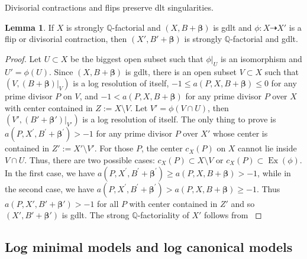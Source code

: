\documentclass[11pt]{amsart}
\numberwithin{equation}{section}
\def\bbeta{\boldsymbol{\beta}}
\def\dim{\operatorname{dim}}
\newcommand\Q{{\mathbb{Q}}}
\theoremstyle{definition}
\theoremstyle{definition}
\newtheorem{theorem}{Theorem}[section]
\newtheorem{lemma}[theorem]{Lemma}
\theoremstyle{definition}
\begin{document}
Divisorial contractions and flips preserve dlt singularities.
\begin{lemma}
If $X$ is strongly $\Q$-factorial and $(X,B+\bbeta)$ is gdlt and $\phi:X\dasharrow X'$ is a flip or divisorial contraction, then $(X',B'+\bbeta )$ is strongly $\Q$-factorial and gdlt. 
\end{lemma}
\begin{proof}
Let $U\subset X$ be the biggest open subset such that $\phi |_U$ is an isomorphism and $U'=\phi (U)$.
Since $(X,B+\bbeta)$ is gdlt, there is an open subset $V\subset X$ such that $(V,(B+\bbeta )|_V)$ is a log resolution of itself, $-1\leq a(P,X,B+\bbeta)\leq 0$ for any prime divisor $P$ on $V$, and $-1<a(P,X,B+\bbeta)$ for any prime divisor $P$ over $X$ with center contained in $Z:=X\setminus V$. Let $V'=\phi(V\cap U)$, then
$(V', (B'+\bbeta ')|_{V'})$  is a log resolution of itself. The only thing to prove is $a\left(P, X^{\prime}, B^{\prime}+\bbeta^{\prime}\right)>-1$ for any prime divisor $P$ over $X'$ whose center is contained in $Z':= X' \setminus V'$. For those $P$, the center $c_X(P)$ on $X$ cannot lie inside $V\cap U$. Thus, there are two possible cases: $c_X(P) \subset X \setminus  V$ or $c_X(P)\subset \operatorname{Ex}(\phi)$. In the first case, we have $a\left(P, X^{\prime}, B^{\prime}+\bbeta^{\prime}\right) \geq a(P, X, B+\bbeta)>-1$, while in the second case, we have $a\left(P, X^{\prime}, B^{\prime}+\bbeta^{\prime}\right)>a(P, X, B+\bbeta) \geq-1$. Thus $a(P,X',B'+\bbeta')>-1$ for all $P$ with center contained in $Z'$ and so $(X',B'+\bbeta')$ is gdlt. The strong $\Q$-factoriality of $X'$ follows from \cite[Lemma 2.5]{DH25}
 \end{proof}
\subsection{Log minimal models and log canonical models}
\end{document}
